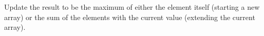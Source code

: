 \documentclass[preview]{standalone}
\begin{document}
Update the result to be the maximum of either the element itself (starting a new array) or the sum of the elements with the current value (extending the current array).\\
\end{document}
